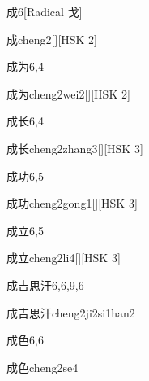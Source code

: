 \begin{entry}{成}{6}[Radical ⼽]
  \begin{phonetics}{成}{cheng2}[][HSK 2]
  \end{phonetics}
\end{entry}

\begin{entry}{成为}{6,4}
  \begin{phonetics}{成为}{cheng2wei2}[][HSK 2]
  \end{phonetics}
\end{entry}

\begin{entry}{成长}{6,4}
  \begin{phonetics}{成长}{cheng2zhang3}[][HSK 3]
  \end{phonetics}
\end{entry}

\begin{entry}{成功}{6,5}
  \begin{phonetics}{成功}{cheng2gong1}[][HSK 3]
  \end{phonetics}
\end{entry}

\begin{entry}{成立}{6,5}
  \begin{phonetics}{成立}{cheng2li4}[][HSK 3]
  \end{phonetics}
\end{entry}

\begin{entry}{成吉思汗}{6,6,9,6}
  \begin{phonetics}{成吉思汗}{cheng2ji2si1han2}
  \end{phonetics}
\end{entry}

\begin{entry}{成色}{6,6}
  \begin{phonetics}{成色}{cheng2se4}
  \end{phonetics}
\end{entry}

